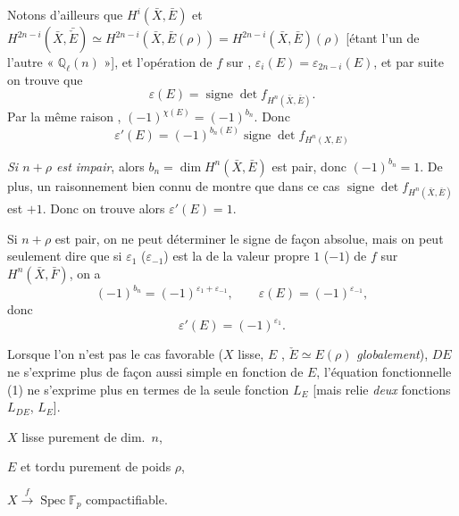 \documentclass[11pt,a4paper]{article}
\begin{document}
Notons d'ailleurs que $H^i(\bar X, \bar E)$ et
$H^{2n-i}(\bar X, \bar{\check E}) \simeq H^{2n-i}(\bar X, \bar E(\rho))
= H^{2n-i}(\bar X, \bar E)(\rho)$ [étant  l'un de l'autre
 « $\mathbb{Q}_\ell(n)$ »], et l'opération de $f$
sur   \ill{} \ill{}
, $\varepsilon_i(E) = \varepsilon_{2n-i}(E)$, et par suite
on trouve que
\[
  \boxed{\varepsilon(E) = \operatorname{signe} \det f_{H^n(\bar X, \bar E)}} .
\]
Par la même raison , $(-1)^{\chi(E)} = (-1)^{b_n}$.
Donc
\[
  \varepsilon'(E) = (-1)^{b_n(E)} \operatorname{signe} \det f_{H^n(X, E)}
\]

\emph{Si $n + \rho$ est impair}, alors $b_n = \dim H^n(\bar X, \bar E)$ est
pair, donc $(-1)^{b_n} = 1$. De plus, un raisonnement bien connu de
 \ill{} \ill{}  montre que dans ce cas $\operatorname{signe} \det f_{H^n(\bar X, \bar E)}$
est $+1$. Donc on trouve alors $\varepsilon'(E) = 1$.

Si $n + \rho$ est pair, on ne peut déterminer  le signe de façon absolue, mais on peut seulement dire que si
$\varepsilon_1$ ($\varepsilon_{-1}$) est la 
\struck{\ill{}} de \struck{\ill{}} la valeur propre $1$ ($-1$) de $f$ sur
$H^n(\bar X, \bar F)$, on a
\[
  (-1)^{b_n} = (-1)^{\varepsilon_1 + \varepsilon_{-1}} , \qquad
  \varepsilon(E) = (-1)^{\varepsilon_{-1}} ,
\]
donc
\[
  \boxed{\varepsilon'(E) = (-1)^{\varepsilon_1}} .
\]

Lorsque l'on n'est pas  le cas favorable ($X$ lisse, $E$
\ill{}, $\check E \simeq E(\rho)$ \emph{globalement}), 
$DE$ ne s'exprime plus de façon aussi simple en fonction de $E$, l'équation
fonctionnelle (1) ne s'exprime plus  en termes de la
seule fonction $L_E$ [mais relie \emph{deux} fonctions $L_{DE}$, $L_E$].

$X$ lisse purement de dim.\ $n$,

$E$ et tordu purement de poids $\rho$,

$X \xrightarrow{f} \operatorname{Spec} \mathbb{F}_p$ compactifiable.
\end{document}
